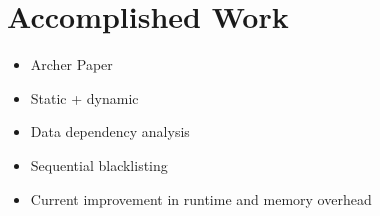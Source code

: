 \section{Accomplished Work}
\label{sec:accomplishedwork}



\begin{itemize}
\item Archer Paper
\item Static + dynamic
\item Data dependency analysis
\item Sequential blacklisting
\item Current improvement in runtime and memory overhead
\end{itemize}

